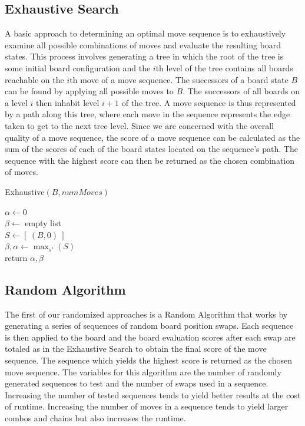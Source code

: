 \documentclass[12pt]{IEEEtran}
\begin{document}
\subsection{Exhaustive Search}
A basic approach to determining an optimal move sequence is to exhaustively examine all possible combinations of moves and evaluate the resulting board states. This process involves generating a tree in which the root of the tree is some initial board configuration and the $i$th level of the tree contains all boards reachable on the $i$th move of a move sequence. The successors of a board state $B$ can be found by applying all possible moves to $B$. The successors of all boards on a level $i$ then inhabit level $i+1$ of the tree. A move sequence is thus represented by a path along this tree, where each move in the sequence represents the edge taken to get to the next tree level. Since we are concerned with the overall quality of a move sequence, the score of a move sequence can be calculated as the sum of the scores of each of the board states located on the sequence's path. The sequence with the highest score can then be returned as the chosen combination of moves.

\begin{algorithm}\label{exhaustive}\small
\caption{\small Exhaustive$(B, numMoves)$}
$\alpha \gets 0$ \\
$\beta \gets $ empty list\\
$S \gets [ \ (B, 0) \ ]$ \\
$\beta , \alpha \gets \max_{s'}(S)$ \\
return $\alpha, \beta$
\end{algorithm}

\subsection{Random Algorithm}

The first of our randomized approaches is a Random Algorithm that works by generating a series of sequences of random board position swaps. Each sequence is then applied to the board and the board evaluation scores after each swap are totaled as in the Exhaustive Search to obtain the final score of the move sequence. The sequence which yields the highest score is returned as the chosen move sequence. The variables for this algorithm are the number of randomly generated sequences to test and the number of swaps used in a sequence. Increasing the number of tested sequences tends to yield better results at the cost of runtime. Increasing the number of moves in a sequence tends to yield larger combos and chains but also increases the runtime.
\end{document}
